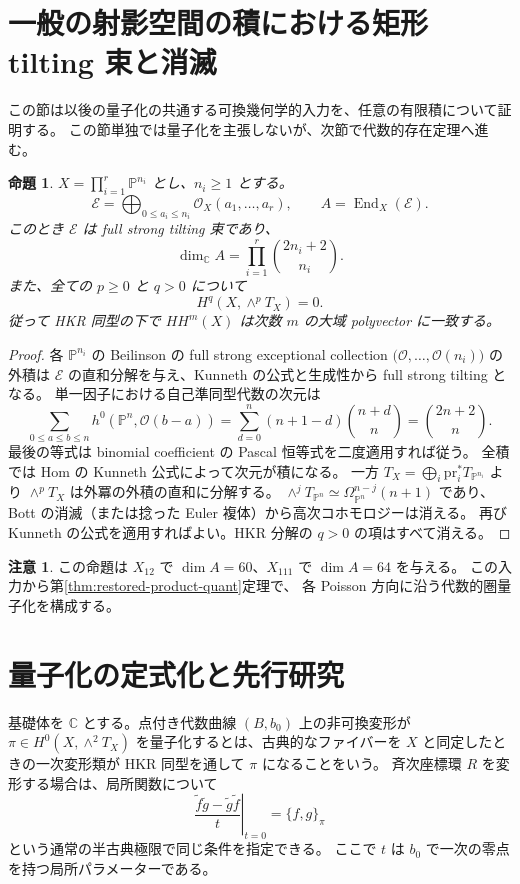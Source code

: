 \documentclass[11pt,a4paper]{ltjsarticle}
\newtheorem{proposition}[theorem]{命題}
\theoremstyle{definition}
\newtheorem{remark}[theorem]{注意}
\newcommand{\CC}{\mathbb C}
\begin{document}
\section{一般の射影空間の積における矩形 tilting 束と消滅}
\label{sec:products-foundation}
この節は以後の量子化の共通する可換幾何学的入力を、任意の有限積について証明する。
この節単独では量子化を主張しないが、次節で代数的存在定理へ進む。
\begin{proposition}\label{prop:products-tilting-rank}
$X=\prod_{i=1}^r\mathbb P^{n_i}$ とし、$n_i\ge1$ とする。
\[
\mathcal E=\bigoplus_{0\le a_i\le n_i}
\mathcal O_X(a_1,\ldots,a_r),\qquad A=\operatorname{End}_X(\mathcal E).
\]
このとき $\mathcal E$ は full strong tilting 束であり、
\[
\dim_{\mathbb C}A=\prod_{i=1}^r\binom{2n_i+2}{n_i}.
\]
また、全ての $p\ge0$ と $q>0$ について
\[
H^q(X,\wedge^pT_X)=0.
\]
従って HKR 同型の下で $HH^m(X)$ は次数 $m$ の大域 polyvector に一致する。
\end{proposition}
\begin{proof}
各 $\mathbb P^{n_i}$ の Beilinson の full strong exceptional collection
$\bigl(\mathcal O,\ldots,\mathcal O(n_i)\bigr)$ の外積は
$\mathcal E$ の直和分解を与え、Kunneth の公式と生成性から full strong tilting となる。
単一因子における自己準同型代数の次元は
\[
\sum_{0\le a\le b\le n}h^0(\mathbb P^n,\mathcal O(b-a))
=\sum_{d=0}^n(n+1-d)\binom{n+d}{n}
=\binom{2n+2}{n}.
\]
最後の等式は binomial coefficient の Pascal 恒等式を二度適用すれば従う。
全積では Hom の Kunneth 公式によって次元が積になる。
一方 $T_X=\bigoplus_i\mathrm{pr}_i^*T_{\mathbb P^{n_i}}$ より
$\wedge^pT_X$ は外冪の外積の直和に分解する。
$\wedge^jT_{\mathbb P^n}\simeq\Omega^{n-j}_{\mathbb P^n}(n+1)$ であり、
Bott の消滅（または捻った Euler 複体）から高次コホモロジーは消える。
再び Kunneth の公式を適用すればよい。HKR 分解の $q>0$ の項はすべて消える。
\end{proof}
\begin{remark}
この命題は $X_{12}$ で $\dim A=60$、$X_{111}$ で $\dim A=64$ を与える。
この入力から第\ref{thm:restored-product-quant}定理で、
各 Poisson 方向に沿う代数的圏量子化を構成する。
\end{remark}

\section{量子化の定式化と先行研究}

基礎体を $\CC$ とする。点付き代数曲線 $(B,b_0)$ 上の非可換変形が
$\pi\in H^0(X,\wedge^2T_X)$ を量子化するとは、古典的なファイバーを
$X$ と同定したときの一次変形類が HKR 同型を通して $\pi$ になることをいう。
斉次座標環 $R$ を変形する場合は、局所関数について
\[
 \left.\frac{\widetilde f\widetilde g-\widetilde g\widetilde f}{t}
 \right|_{t=0}=\{f,g\}_{\pi}
\]
という通常の半古典極限で同じ条件を指定できる。
ここで $t$ は $b_0$ で一次の零点を持つ局所パラメーターである。
\end{document}

